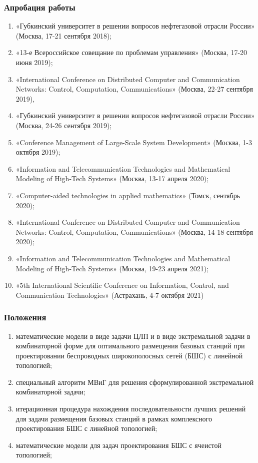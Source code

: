 \begin{frame}
    \frametitle{Апробация работы}
    \begin{enumerate} %
        \fontsize{8pt}{7.2}\selectfont
        \item «Губкинский университет в решении вопросов нефтегазовой отрасли России» (Москва, 17-21 сентября 2018); 
        \item «13-е Всероссийское совещание по проблемам управления» (Москва, 17-20 июня 2019); 
        \item «International Conference on Distributed Computer and Communication Networks: Control, Computation, Communications» (Москва, 22-27 сентября 2019), 
        \item «Губкинский университет в решении вопросов нефтегазовой отрасли России» (Москва, 24-26 сентября 2019); 
        \item «Conference Management of Large-Scale System Development» (Москва, 1-3 октября 2019); 
        \item «Information and Telecommunication Technologies and Mathematical Modeling of High-Tech Systems» (Москва, 13-17 апреля 2020); 
        \item «Computer-aided technologies in applied mathematics» (Томск, сентябрь 2020);
        \item «International Conference on Distributed Computer and Communication Networks: Control, Computation, Communications» (Москва, 14-18 сентября 2020); 
        \item «Information and Telecommunication Technologies and Mathematical Modeling of High-Tech Systems» (Москва, 19-23 апреля 2021);
        \item «5th International Scientific Conference on Information, Control, and Communication Technologies» (Астрахань, 4-7 октября 2021)
      \end{enumerate}
\end{frame}

\begin{frame}
    \frametitle{Положения}
    \begin{enumerate} %
        \item математические модели в виде задачи ЦЛП и в виде экстремальной задачи в комбинаторной форме для оптимального размещения базовых станций при
        проектировании беспроводных широкополосных сетей (БШС) с линейной топологией;
        \item специальный алгоритм МВиГ для решения сформулированной экстремальной комбинаторной задачи;
        \item итерационная процедура нахождения последовательности лучших решений для задачи размещения базовых станций в рамках комплексного
        проектирования БШС с линейной топологией;
        \item математические модели для задач  проектирования БШС с ячеистой
        топологией;
      \end{enumerate}
\end{frame}



